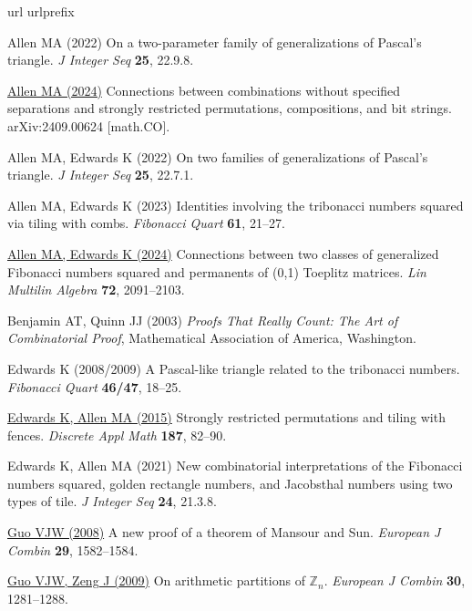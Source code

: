 \documentclass[preprint,3p]{elsarticle}
\newcommand{\bihl}[2]{\hypersetup{urlcolor=LinkColour}\href{https://doi.org/#1}{#2}\hypersetup{urlcolor=black}}
\begin{document}
%
\begin{thebibliography}{10}
\expandafter\ifx\csname url\endcsname\relax
\def\url#1{{\tt #1}}\fi
\expandafter\ifx\csname urlprefix\endcsname\relax\def\urlprefix{URL }\fi

Allen MA (2022) On a two-parameter family of generalizations of {Pascal}'s
  triangle. \textit{J Integer Seq} \textbf{25}, 22.9.8.

 \bihl{10.48550/arXiv.2409.00624}{%
Allen MA (2024)} Connections between combinations without specified separations
  and strongly restricted permutations, compositions, and bit strings.
 arXiv:2409.00624 [math.CO].

Allen MA, Edwards K (2022) On two families of generalizations of {Pascal}'s
  triangle. \textit{J Integer Seq} \textbf{25}, 22.7.1.

Allen MA, Edwards K (2023) Identities involving the tribonacci numbers squared
  via tiling with combs. \textit{Fibonacci Quart} \textbf{61}, 21--27.

 \bihl{10.1080/03081087.2022.2107979}{%
Allen MA, Edwards K (2024)} Connections between two classes of generalized
  {Fibonacci} numbers squared and permanents of (0,1) {Toeplitz} matrices.
  \textit{Lin Multilin Algebra} \textbf{72}, 2091--2103.

Benjamin AT, Quinn JJ (2003) \textit{Proofs That Really Count: The Art of
  Combinatorial Proof}, Mathematical Association of America, Washington.

Edwards K (2008/2009) A {Pascal}-like triangle related to the tribonacci
  numbers. \textit{Fibonacci Quart} \textbf{46/47}, 18--25.

 \bihl{10.1016/j.dam.2015.02.004}{%
Edwards K, Allen MA (2015)} Strongly restricted permutations and tiling with
  fences. \textit{Discrete Appl Math} \textbf{187}, 82--90.

Edwards K, Allen MA (2021) New combinatorial interpretations of the {Fibonacci}
  numbers squared, golden rectangle numbers, and {Jacobsthal} numbers using two
  types of tile. \textit{J Integer Seq} \textbf{24}, 21.3.8.

 \bihl{10.1016/j.ejc.2007.11.024}{%
Guo VJW (2008)} A new proof of a theorem of {Mansour} and {Sun}.
  \textit{European J Combin} \textbf{29}, 1582--1584.

 \bihl{10.1016/j.ejc.2008.11.009}{%
Guo VJW, Zeng J (2009)} On arithmetic partitions of {$\mathbb{Z}_n$}.
  \textit{European J Combin} \textbf{30}, 1281--1288.


\end{thebibliography}
\end{document}
